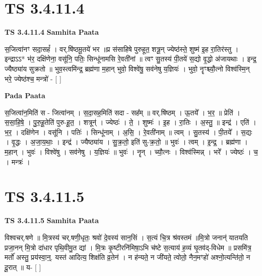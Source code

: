 \documentclass[17pt]{extarticle}
\begin{document}
\section*{ TS 3.4.11.4 }

\textbf{TS 3.4.11.4 } \newline
\textbf{Samhita Paata} \newline

स॒जित्वा॑नꣳ सदा॒सहं᳚ । वर्.षि॑ष्ठमू॒तये॑ भर ॥प्र स॑साहिषे पुरुहूत॒ शत्रू॒न् ज्येष्ठ॑स्ते॒ शुष्म॑ इ॒ह रा॒तिर॑स्तु । इन्द्राऽऽ* भ॑र॒ दक्षि॑णेना॒ वसू॑नि॒ पतिः॒ सिन्धू॑नामसि रे॒वती॑नां ॥ त्वꣳ सु॒तस्य॑ पी॒तये॑ स॒द्यो वृ॒द्धो अ॑जायथाः । इन्द्र॒ ज्यैष्ठ्या॑य सुक्रतो ॥ भुव॒स्त्वमि॑न्द्र॒ ब्रह्म॑णा म॒हान् भुवो॒ विश्वे॑षु॒ सव॑नेषु य॒ज्ञियः॑ । भुवो॒ नॄꣳश्च्यौ॒त्नो विश्व॑स्मि॒न् भरे॒ ज्येष्ठ॑श्च॒ मन्त्रो॑ - [  ] \newline

\textbf{Pada Paata} \newline

स॒जित्वा॑न॒मिति॑ स - जित्वा॑नम् । स॒दा॒सह॒मिति॑ सदा - सह᳚म् ॥ वर्.षि॑ष्ठम् । ऊ॒तये᳚ । भ॒र॒ ॥ प्रेति॑ । स॒सा॒हि॒षे॒ । पु॒रु॒हू॒तेति॑ पुरु-हू॒त॒ । शत्रून्॑ । ज्येष्ठः॑ । ते॒ । शुष्मः॑ । इ॒ह । रा॒तिः । अ॒स्तु॒ ॥ इन्द्र॑ । एति॑ । भ॒र॒ । दक्षि॑णेन । वसू॑नि । पतिः॑ । सिन्धू॑नाम् । अ॒सि॒ । रे॒वती॑नाम् ॥ त्वम् । सु॒तस्य॑ । पी॒तये᳚ । स॒द्यः । वृ॒द्धः । अ॒जा॒य॒थाः॒ । इन्द्र॑ । ज्यैष्ठ्या॑य । सु॒क्र॒तो॒ इति॑ सु-क्र॒तो॒ ॥ भुवः॑ । त्वम् । इ॒न्द्र॒ । ब्रह्म॑णा । म॒हान् । भुवः॑ । विश्वे॑षु । सव॑नेषु । य॒ज्ञियः॑ ॥ भुवः॑ । नॄन् । च्यौ॒त्नः । विश्व॑स्मिन्न् । भरे᳚ । ज्येष्ठः॑ । च॒ । मन्त्रः॑ ।  \newline




\section*{ TS 3.4.11.5 }

\textbf{TS 3.4.11.5 } \newline
\textbf{Samhita Paata} \newline

विश्वचर्.षणे ॥ मि॒त्रस्य॑ चर्.षणी॒धृतः॒ श्रवो॑ दे॒वस्य॑ सान॒सिं । स॒त्यं चि॒त्र श्र॑वस्तमं ॥मि॒त्रो जनान्॑ यातयति प्रजा॒नन् मि॒त्रो दा॑धार पृथि॒वीमु॒त द्यां । मि॒त्रः कृ॒ष्टीरनि॑मिषा॒ऽभि च॑ष्टे स॒त्याय॑ ह॒व्यं घृ॒तव॑द्-विधेम ॥ प्रसमि॑त्र॒ मर्तो॑ अस्तु॒ प्रय॑स्वा॒न्॒. यस्त॑ आदित्य॒ शिक्ष॑ति व्र॒तेन॑ । न ह॑न्यते॒ न जी॑यते॒ त्वोतो॒ नैन॒मꣳहो॑ अश्नो॒त्यन्ति॑तो॒ न दू॒रात् ॥ य- [  ] \newline
\end{document}
